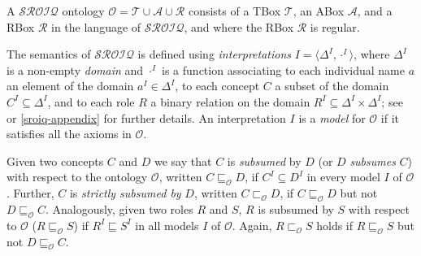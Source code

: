 \begin{definition}
    A $\mathcal{SROIQ}$  ontology $\mathcal{O} = \mathcal{T} \cup \mathcal{A} \cup \mathcal{R}$ consists of a TBox $\mathcal{T}$, an ABox $\mathcal{A}$, and a RBox $\mathcal{R}$ in the language of $\mathcal{SROIQ}$, and where the RBox $\mathcal{R}$ is regular.
\end{definition}

The semantics of $\mathcal{SROIQ}$ is  defined using \emph{interpretations} $I = \langle \Delta^I, \cdot^I \rangle$, where $\Delta^I$ is a non-empty \emph{domain} and $\cdot^I$ is a function associating to each individual name $a$ an element of the domain $a^I \in \Delta^I$, to each concept $C$ a subset of the domain $C^I \subseteq \Delta^I$, and to each role $R$ a binary relation on the domain $R^I \subseteq \Delta^I \times \Delta^I$; see \cite{baader_horrocks_lutz_sattler_2017,HorrocksKutzSattlerKR2006} or \cref{sroiq-appendix} for further details. An interpretation $I$ is a \emph{model} for $\mathcal{O}$ if it satisfies all the axioms in $\mathcal{O}$.

Given two concepts $C$ and $D$ we say that $C$ is \emph{subsumed} by $D$ (or $D$ \emph{subsumes} $C$) with respect to the ontology $\mathcal{O}$, written $C \sqsubseteq_\mathcal{O} D$, if $C^I \subseteq D^I$ in every model $I$ of $\mathcal{O}$. Further, $C$ is \emph{strictly subsumed by} $D$, written $C \sqsubset_\mathcal{O} D$, if $C \sqsubseteq_\mathcal{O} D$ but not $D \sqsubseteq_\mathcal{O} C$. Analogously, given two roles $R$ and $S$, $R$ is subsumed by $S$ with respect to $\mathcal{O}$ ($R \sqsubseteq_\mathcal{O} S$) if $R^I \sqsubseteq S^I$ in all models $I$ of $\mathcal{O}$. Again, $R \sqsubset_\mathcal{O} S$ holds if $R \sqsubseteq_\mathcal{O} S$ but not $D \sqsubseteq_\mathcal{O} C$.
